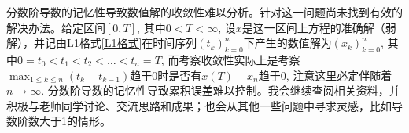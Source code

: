分数阶导数的记忆性导致数值解的收敛性难以分析。针对这一问题尚未找到有效的解决办法。给定区间$[0,T]$, 其中$0<T<\infty$, 设$x$是这一区间上方程的准确解（弱解），并记由L1格式\eqref{L1格式}在时间序列$\left(t_k\right)_{k=0}^n$下产生的数值解为$\left(x_k\right)_{k=0}^n$, 其中$0=t_0<t_1<t_2<\dots<t_n=T$, 而考察收敛性实际上是考察$\max_{1\leqslant k\leqslant n} \left(t_k-t_{k-1}\right)$趋于0时是否有$x(T)-x_n$趋于0, 注意这里必定伴随着$n\to \infty$. 分数阶导数的记忆性导致累积误差难以控制。我会继续查阅相关资料，并积极与老师同学讨论、交流思路和成果；也会从其他一些问题中寻求灵感，比如导数阶数大于1的情形。